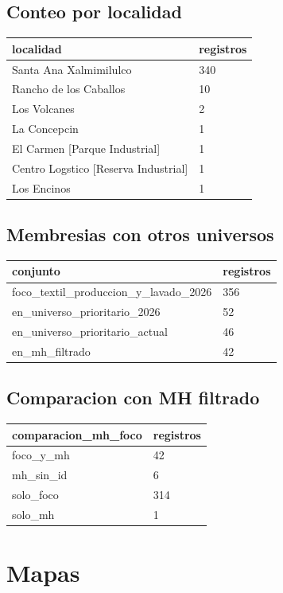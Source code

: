 \documentclass[11pt]{article}
\begin{document}
\subsection{Conteo por localidad}

\begin{tabular}{ll}
\toprule
localidad & registros \\
\midrule
Santa Ana Xalmimilulco & 340 \\
Rancho de los Caballos & 10 \\
Los Volcanes & 2 \\
La Concepcin & 1 \\
El Carmen [Parque Industrial] & 1 \\
Centro Logstico [Reserva Industrial] & 1 \\
Los Encinos & 1 \\
\bottomrule
\end{tabular}

\subsection{Membresias con otros universos}

\begin{tabular}{ll}
\toprule
conjunto & registros \\
\midrule
foco\_textil\_produccion\_y\_lavado\_2026 & 356 \\
en\_universo\_prioritario\_2026 & 52 \\
en\_universo\_prioritario\_actual & 46 \\
en\_mh\_filtrado & 42 \\
\bottomrule
\end{tabular}

\subsection{Comparacion con MH filtrado}

\begin{tabular}{ll}
\toprule
comparacion\_mh\_foco & registros \\
\midrule
foco\_y\_mh & 42 \\
mh\_sin\_id & 6 \\
solo\_foco & 314 \\
solo\_mh & 1 \\
\bottomrule
\end{tabular}

\section{Mapas}
\end{document}
